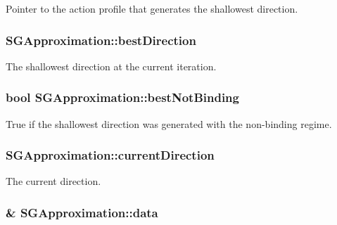 Pointer to the action profile that generates the shallowest direction. \hypertarget{class_s_g_approximation_a1dd4f78e0789e61ee5c467afc403fc6d}{
\subsubsection[{best\+Direction}]{ S\+G\+Approximation\+::best\+Direction\hspace{0.3cm}{\ttfamily [private]}}}\label{class_s_g_approximation_a1dd4f78e0789e61ee5c467afc403fc6d}
The shallowest direction at the current iteration. \hypertarget{class_s_g_approximation_a3f55b0a9fb9f8e2c3ae6949bc8fd046c}{
\subsubsection[{best\+Not\+Binding}]{\setlength{\rightskip}{0pt plus 5cm}bool S\+G\+Approximation\+::best\+Not\+Binding\hspace{0.3cm}{\ttfamily [private]}}}\label{class_s_g_approximation_a3f55b0a9fb9f8e2c3ae6949bc8fd046c}
True if the shallowest direction was generated with the non-\/binding regime. \hypertarget{class_s_g_approximation_a603408048cb6c1a13078c27a017e8202}{
\subsubsection[{current\+Direction}]{ S\+G\+Approximation\+::current\+Direction\hspace{0.3cm}{\ttfamily [private]}}}\label{class_s_g_approximation_a603408048cb6c1a13078c27a017e8202}
The current direction. \hypertarget{class_s_g_approximation_a5b38e362e6520eeb30f1bd446e2fb70e}{
\subsubsection[{data}]{\& S\+G\+Approximation\+::data\hspace{0.3cm}{\ttfamily [private]}}}\label{class_s_g_approximation_a5b38e362e6520eeb30f1bd446e2fb70e}
